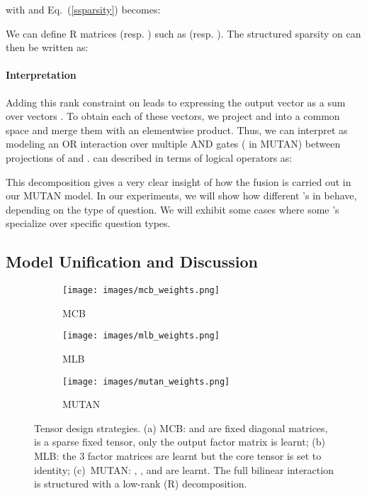 \documentclass[10pt,twocolumn,letterpaper]{article}
\begin{document}
with  and 
Eq.~(\ref{ssparsity}) becomes:

We can define R matrices  (resp. ) such as  (resp. ). The structured sparsity on  can then be written as:


\paragraph{Interpretation}
Adding this rank constraint on  leads to expressing the output vector  as a sum over  vectors . To obtain each of these vectors, we project  and  into a common space and merge them with an elementwise product. Thus, we can interpret  as modeling an OR interaction over multiple AND gates ( in MUTAN) between projections of  and .  can described in terms of logical operators as: 

This decomposition gives a very clear insight of how the fusion is carried out in our MUTAN model. In our experiments, we will show how different 's in  behave, depending on the type of question. We will exhibit some cases where some 's specialize over specific question types.
\subsection{Model Unification and Discussion}\label{uniformization}
\begin{figure*}[t]
\centering
  \begin{subfigure}{0.3\linewidth}
	\centering
    \texttt{[image: images/mcb\_weights.png]}
	\caption{\label{bilinear_compare:a} MCB}
  \end{subfigure}
  \hspace{1px}
  \begin{subfigure}{0.3\linewidth}
  \centering
    \texttt{[image: images/mlb\_weights.png]} 
    \caption{\label{bilinear_compare:b} MLB} 
  \end{subfigure} 
  \begin{subfigure}{0.3\linewidth}
  \centering
    \texttt{[image: images/mutan\_weights.png]}  
    \caption{\label{bilinear_compare:c} MUTAN}
  \end{subfigure}
  \caption{\label{bilinear_compare} Tensor design strategies. (a) MCB:   and  are fixed diagonal matrices,  is a sparse fixed tensor, only the output factor matrix  is learnt; (b) MLB: the 3 factor matrices are learnt but the core tensor is   set to identity; 
 (c)~MUTAN: , ,  and  are learnt. The  full bilinear interaction  is structured with a low-rank (R) decomposition.
}
  \label{fig7} 
\end{figure*}
\end{document}
